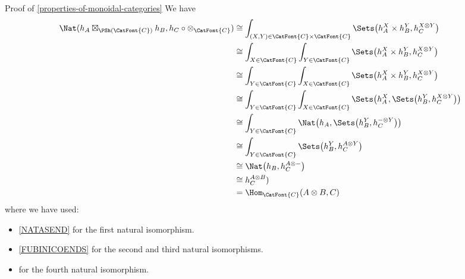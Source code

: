 \begin{Proof}{Proof of \cref{properties-of-monoidal-categories}}
    We have
    \begin{align*}
        \Nat(h_{A}\boxtimes_{\PSh(\CatFont{C})}h_{B},h_{C}\circ\mathord{\otimes_{\CatFont{C}}}) &\cong \int_{(X,Y)\in\CatFont{C}\times\CatFont{C}}\Sets\big(h^{X}_{A}\times h^{Y}_{B},h^{X\otimes Y}_{C}\big)\\
                                                                                                &\cong \int_{X\in\CatFont{C}}\int_{Y\in\CatFont{C}}\Sets\big(h^{X}_{A}\times h^{Y}_{B},h^{X\otimes Y}_{C}\big)\\
                                                                                                &\cong \int_{Y\in\CatFont{C}}\int_{X\in\CatFont{C}}\Sets\big(h^{X}_{A}\times h^{Y}_{B},h^{X\otimes Y}_{C}\big)\\
                                                                                                &\cong \int_{Y\in\CatFont{C}}\int_{X\in\CatFont{C}}\Sets\big(h^{X}_{A},\Sets\big(h^{Y}_{B},h^{X\otimes Y}_{C}\big)\big)\\
                                                                                                &\cong \int_{Y\in\CatFont{C}}\Nat\big(h_{A},\Sets\big(h^{Y}_{B},h^{-\otimes Y}_{C}\big)\big)\\
                                                                                                &\cong \int_{Y\in\CatFont{C}}\Sets\big(h^{Y}_{B},h^{A\otimes Y}_{C}\big)\\
                                                                                                &\cong \Nat\big(h_{B},h^{A\otimes-}_{C}\big)\\
                                                                                                &\cong h^{A\otimes B}_{C})\\
                                                                                                &=     \Hom_{\CatFont{C}}(A\otimes B,C)
    \end{align*}
    where we have used:
    \begin{itemize}
        \item \cref{NATASEND}     for the first natural isomorphism.
        \item \cref{FUBINICOENDS} for the second and third natural isomorphisms.
        \item {} for the fourth natural isomorphism.

\end{itemize}
\end{Proof}
